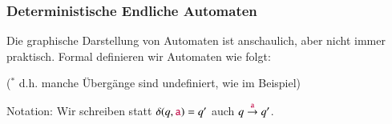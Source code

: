 \documentclass[onlymath]{beamer}
\begin{document}
\begin{frame}\frametitle{Deterministische Endliche Automaten}

Die graphische Darstellung von Automaten ist anschaulich, aber nicht immer praktisch.
Formal definieren wir Automaten wie folgt:\bigskip

{\footnotesize (\alert{$^*$} d.h. manche Übergänge sind undefiniert, wie im Beispiel)}
\medskip

\alert{Notation:} Wir schreiben statt $\delta(q,\mathtt{\textcolor{purple}{a}})=q'$ auch $q\stackrel{\mathtt{\textcolor{purple}{a}}}{\to}q'$.

% 

\end{frame}
\end{document}
